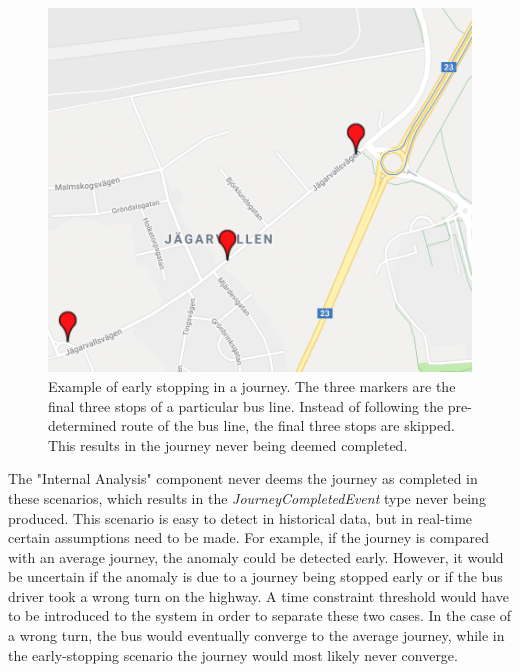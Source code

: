 \begin{figure}[ht!]
    \centering
    \includegraphics[width=\textwidth]{figures/edge_case_early_quit}
    \caption{Example of early stopping in a journey.
    The three markers are the final three stops of a particular bus line.
    Instead of following the pre-determined route of the bus line, the final three stops are skipped.
    This results in the journey never being deemed completed.}
    \label{fig:human-error-early-stopping-1}
\end{figure}

The "Internal Analysis" component never deems the journey as completed in these scenarios, which results in the \textit{JourneyCompletedEvent} type never being produced.
This scenario is easy to detect in historical data, but in real-time certain assumptions need to be made.
For example, if the journey is compared with an average journey, the anomaly could be detected early.
However, it would be uncertain if the anomaly is due to a journey being stopped early or if the bus driver took a wrong turn on the highway.
A time constraint threshold would have to be introduced to the system in order to separate these two cases.
In the case of a wrong turn, the bus would eventually converge to the average journey, while in the early-stopping scenario the journey would most likely never converge.

